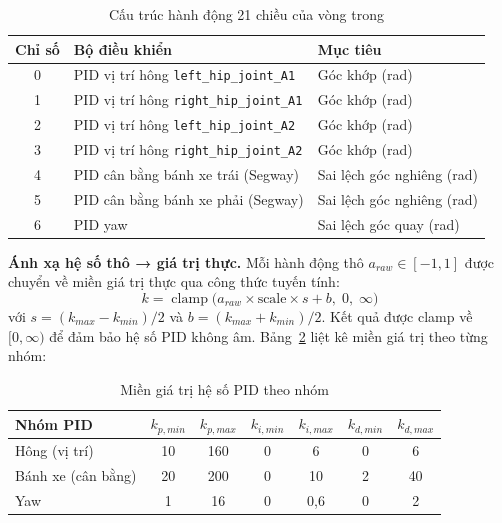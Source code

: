 \begin{table}[H]
    \centering
    \caption{Cấu trúc hành động 21 chiều của vòng trong}
    \label{tab:inner_action}
    \renewcommand{\arraystretch}{1.3}
    \begin{tabular}{|c|l|l|}
    \hline
    \textbf{Chỉ số} & \textbf{Bộ điều khiển} & \textbf{Mục tiêu} \\
    \hline
    0 & PID vị trí hông \texttt{left\_hip\_joint\_A1}  & Góc khớp (rad) \\
    1 & PID vị trí hông \texttt{right\_hip\_joint\_A1} & Góc khớp (rad) \\
    2 & PID vị trí hông \texttt{left\_hip\_joint\_A2}  & Góc khớp (rad) \\
    3 & PID vị trí hông \texttt{right\_hip\_joint\_A2} & Góc khớp (rad) \\
    4 & PID cân bằng bánh xe trái (Segway)             & Sai lệch góc nghiêng (rad) \\
    5 & PID cân bằng bánh xe phải (Segway)             & Sai lệch góc nghiêng (rad) \\
    6 & PID yaw                                         & Sai lệch góc quay (rad) \\
    \hline
    \end{tabular}
\end{table}

\textbf{Ánh xạ hệ số thô → giá trị thực.}
Mỗi hành động thô $a_{raw} \in [-1, 1]$ được chuyển về miền giá trị
thực qua công thức tuyến tính:
\begin{equation}
    k = \operatorname{clamp}\!\bigl(a_{raw} \times \text{scale} \times s + b,\; 0,\; \infty\bigr)
    \label{eq:gain_mapping}
\end{equation}
với $s = (k_{max} - k_{min})/2$ và $b = (k_{max} + k_{min})/2$.
Kết quả được clamp về $[0, \infty)$ để đảm bảo hệ số PID không âm.
Bảng~\ref{tab:gain_bounds} liệt kê miền giá trị theo từng nhóm:

\begin{table}[H]
    \centering
    \caption{Miền giá trị hệ số PID theo nhóm}
    \label{tab:gain_bounds}
    \renewcommand{\arraystretch}{1.3}
    \begin{tabular}{|l|c|c|c|c|c|c|}
    \hline
    \textbf{Nhóm PID} & $k_{p,min}$ & $k_{p,max}$ & $k_{i,min}$ & $k_{i,max}$ & $k_{d,min}$ & $k_{d,max}$ \\
    \hline
    Hông (vị trí)    & 10  & 160  & 0   & 6    & 0   & 6    \\
    Bánh xe (cân bằng)& 20  & 200  & 0   & 10   & 2   & 40   \\
    Yaw              & 1   & 16   & 0   & 0{,}6 & 0  & 2    \\
    \hline
    \end{tabular}
\end{table}

